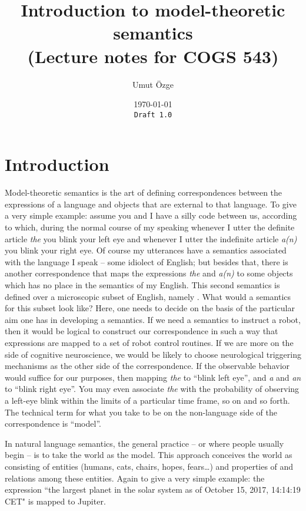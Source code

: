\documentclass[11pt,a4paper,draft]{article}
\title{Introduction to model-theoretic semantics\\ \small (Lecture notes for COGS 543)}
\author{Umut \"Ozge}
\date{\today\\ \texttt{Draft 1.0}}
\begin{document}
\maketitle

\section{Introduction}

Model-theoretic semantics is the art of defining correspondences between the expressions of a language and objects that are external to that language. To give a very simple example: assume you and I have a silly code between us, according to which, during the normal course of my speaking whenever I utter the definite article \emph{the} you blink your left eye and whenever I utter the indefinite article \emph{a(n)} you blink your right eye. Of course my utterances have a semantics associated with the language I speak -- some idiolect of English; but besides that, there is another correspondence that maps the expressions \emph{the} and \emph{a(n)} to some objects which has no place in the semantics of my English. This second semantics is defined over a microscopic subset of English, namely . What would a semantics for this subset look like? Here, one needs to decide on the basis of the particular aim one has in developing a semantics. If we need a semantics to instruct a robot, then it would be logical to construct our correspondence in such a way that expressions are mapped to a set of robot control routines. If we are more on the side of cognitive neuroscience, we would be likely to choose neurological triggering mechanisms as the other side of the correspondence. If the observable behavior would suffice for our purposes, then mapping \emph{the} to ``blink left eye'', and \emph{a} and \emph{an} to ``blink right eye''. You may even associate \emph{the} with the probability of observing a left-eye blink within the limits of a particular time frame, so on and so forth. The technical term for what you take to be on the non-language side of the correspondence is ``model''.

In natural language semantics, the general practice -- or where people usually begin -- is to take the world as the model. This approach conceives the world as consisting of entities (humans, cats, chairs, hopes, fears\ldots) and properties of and relations among these entities. Again to give a very simple example: the expression ``the largest planet in the solar system as of October 15, 2017, 14:14:19 CET" is mapped to Jupiter. 
\end{document}
